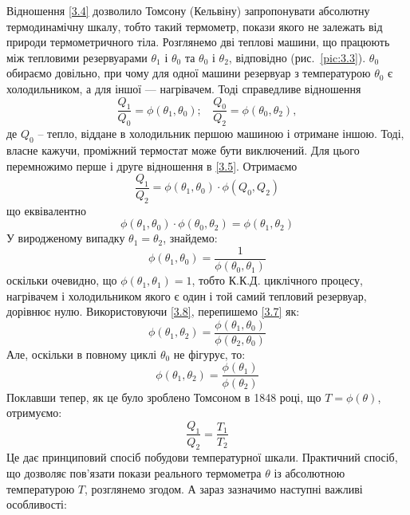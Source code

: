 Відношення \eqref{3.4} дозволило Томсону (Кельвіну) запропонувати абсолютну  термодинамічну шкалу,
тобто такий термометр, покази якого не залежать від природи термометричного тіла. Розглянемо дві
теплові машини, що працюють між тепловими резервуарами $\theta_1$ і $\theta_0$ та $\theta_0$ і
$\theta_2$, відповідно (рис.~\ref{pic:3.3}). $\theta_0$ обираємо довільно, при чому для одної машини
резервуар з температурою $\theta_0$ є холодильником, а для іншої --- нагрівачем. Тоді справедливе
відношення
\begin{equation}\label{3.5}
	\dfrac{Q_1}{Q_0} = \phi(\theta_1, \theta_0); ~~ ~~ \dfrac{Q_0}{Q_2} = \phi(\theta_0, \theta_2),
\end{equation}
де $Q_0$ – тепло, віддане в холодильник першою машиною і отримане іншою. Тоді, власне кажучи,
проміжний термостат може бути виключений. Для цього перемножимо перше і друге відношення в
\eqref{3.5}. Отримаємо
\begin{equation}\label{3.6}
	\dfrac{Q_1}{Q_2} = \phi(\theta_1, \theta_0)\cdot\phi(Q_0,Q_2)
\end{equation}
що еквівалентно
\begin{equation}\label{3.7}
	\phi(\theta_1, \theta_0)\cdot\phi(\theta_0,\theta_2) = \phi(\theta_1, \theta_2)
\end{equation}
У виродженому випадку $\theta_1 = \theta_2$, знайдемо:
\begin{equation}\label{3.8}
	\phi (\theta_1, \theta_0) = \dfrac{1}{\phi(\theta_0, \theta_1)}
\end{equation}
оскільки очевидно, що $\phi(\theta_1,\theta_1)=1$, тобто К.К.Д. циклічного процесу, нагрівачем і
холодильником якого є один і той самий тепловий резервуар, дорівнює нулю. Використовуючи \eqref{3.8},
перепишемо \eqref{3.7} як:
\begin{equation}\label{3.9}
	\phi(\theta_1, \theta_2) = \dfrac{\phi(\theta_1, \theta_0)}{\phi(\theta_2, \theta_0)}
\end{equation}
Але, оскільки в повному циклі $\theta_0$ не фігурує, то:
\begin{equation}\label{3.10}
	\phi(\theta_1, \theta_2) = \dfrac{\phi(\theta_1)}{\phi(\theta_2)}
\end{equation}
Поклавши тепер, як це було зроблено Томсоном в 1848 році, що $T= \phi(\theta)$, отримуємо:
\begin{equation}\label{3.11}
	\dfrac{Q_1}{Q_2} = \dfrac{T_1}{T_2}
\end{equation}
Це дає принциповий спосіб побудови температурної шкали. Практичний спосіб, що дозволяє пов'язати покази реального термометра $\theta$ із абсолютною температурою $T$, розглянемо згодом. А зараз зазначимо наступні важливі особливості:
